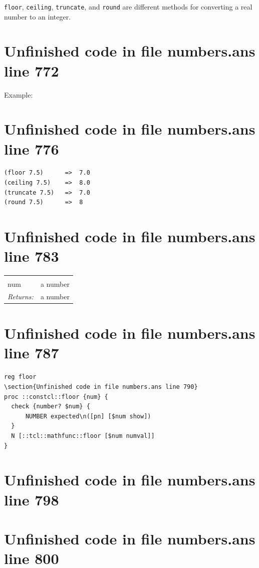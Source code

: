 \documentclass[twoside,9pt]{report}
\begin{document}
\texttt{floor}, \texttt{ceiling}, \texttt{truncate}, and \texttt{round} are different methods for converting a real number to an integer.

\section{Unfinished code in file numbers.ans line 772}


Example:

\section{Unfinished code in file numbers.ans line 776}
\begin{verbatim}
(floor 7.5)      =>  7.0
(ceiling 7.5)    =>  8.0
(truncate 7.5)   =>  7.0
(round 7.5)      =>  8
\end{verbatim}
\section{Unfinished code in file numbers.ans line 783}
\noindent\begin{tabular}{ |p{1.9cm} p{8cm}| }
\hline
\rowcolor[HTML]{CCCCCC} \multicolumn{2}{|l|}{\bf floor, ceiling, truncate, round (public)} \\
num & a number \\
\textit{Returns:} & a number \\
\hline
\end{tabular}
\section{Unfinished code in file numbers.ans line 787}
\begin{lstlisting}
reg floor
\section{Unfinished code in file numbers.ans line 790}
proc ::constcl::floor {num} {
  check {number? $num} {
      NUMBER expected\n([pn] [$num show])
  }
  N [::tcl::mathfunc::floor [$num numval]]
}
\end{lstlisting}
\section{Unfinished code in file numbers.ans line 798}
\section{Unfinished code in file numbers.ans line 800}
\end{document}
